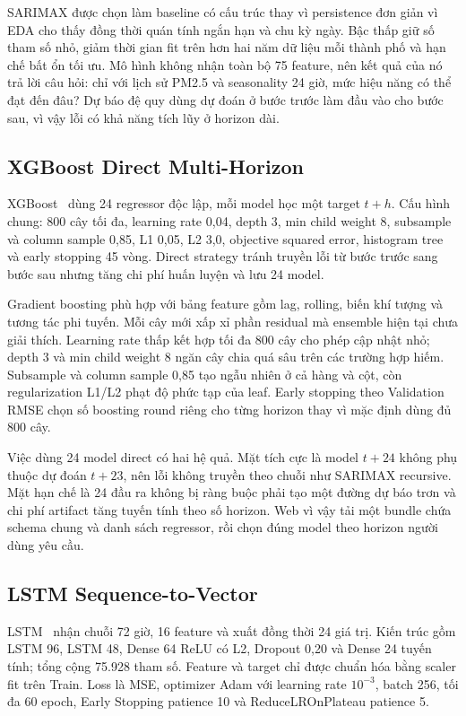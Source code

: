 \documentclass[11pt,a4paper]{article}
\begin{document}
SARIMAX được chọn làm baseline có cấu trúc thay vì persistence đơn giản vì EDA cho thấy đồng thời quán tính ngắn hạn và chu kỳ ngày. Bậc thấp giữ số tham số nhỏ, giảm thời gian fit trên hơn hai năm dữ liệu mỗi thành phố và hạn chế bất ổn tối ưu. Mô hình không nhận toàn bộ 75 feature, nên kết quả của nó trả lời câu hỏi: chỉ với lịch sử PM2.5 và seasonality 24 giờ, mức hiệu năng có thể đạt đến đâu? Dự báo đệ quy dùng dự đoán ở bước trước làm đầu vào cho bước sau, vì vậy lỗi có khả năng tích lũy ở horizon dài.

\subsection{XGBoost Direct Multi-Horizon}
XGBoost~\cite{xgb} dùng 24 regressor độc lập, mỗi model học một target $t+h$. Cấu hình chung: 800 cây tối đa, learning rate 0,04, depth 3, min child weight 8, subsample và column sample 0,85, L1 0,05, L2 3,0, objective squared error, histogram tree và early stopping 45 vòng. Direct strategy tránh truyền lỗi từ bước trước sang bước sau nhưng tăng chi phí huấn luyện và lưu 24 model.

Gradient boosting phù hợp với bảng feature gồm lag, rolling, biến khí tượng và tương tác phi tuyến. Mỗi cây mới xấp xỉ phần residual mà ensemble hiện tại chưa giải thích. Learning rate thấp kết hợp tối đa 800 cây cho phép cập nhật nhỏ; depth 3 và min child weight 8 ngăn cây chia quá sâu trên các trường hợp hiếm. Subsample và column sample 0,85 tạo ngẫu nhiên ở cả hàng và cột, còn regularization L1/L2 phạt độ phức tạp của leaf. Early stopping theo Validation RMSE chọn số boosting round riêng cho từng horizon thay vì mặc định dùng đủ 800 cây.

Việc dùng 24 model direct có hai hệ quả. Mặt tích cực là model $t+24$ không phụ thuộc dự đoán $t+23$, nên lỗi không truyền theo chuỗi như SARIMAX recursive. Mặt hạn chế là 24 đầu ra không bị ràng buộc phải tạo một đường dự báo trơn và chi phí artifact tăng tuyến tính theo số horizon. Web vì vậy tải một bundle chứa schema chung và danh sách regressor, rồi chọn đúng model theo horizon người dùng yêu cầu.

\subsection{LSTM Sequence-to-Vector}
LSTM~\cite{lstm} nhận chuỗi 72 giờ, 16 feature và xuất đồng thời 24 giá trị. Kiến trúc gồm LSTM 96, LSTM 48, Dense 64 ReLU có L2, Dropout 0,20 và Dense 24 tuyến tính; tổng cộng 75.928 tham số. Feature và target chỉ được chuẩn hóa bằng scaler fit trên Train. Loss là MSE, optimizer Adam với learning rate $10^{-3}$, batch 256, tối đa 60 epoch, Early Stopping patience 10 và ReduceLROnPlateau patience 5.
\end{document}
